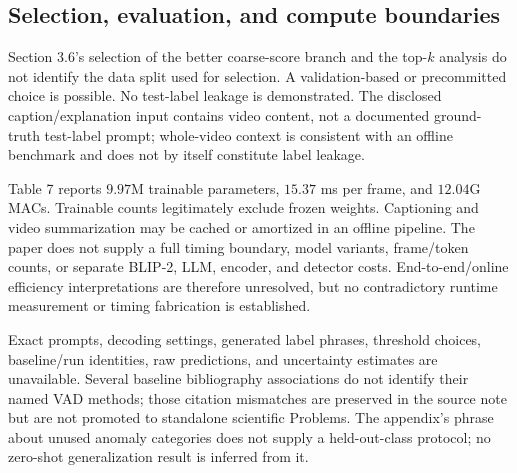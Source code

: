 \documentclass[10pt]{article}
\begin{document}
\subsection*{Selection, evaluation, and compute boundaries}
Section 3.6’s selection of the better coarse-score branch and the top-\(k\) analysis do not identify the data split used for selection. A validation-based or precommitted choice is possible. No test-label leakage is demonstrated. The disclosed caption/explanation input contains video content, not a documented ground-truth test-label prompt; whole-video context is consistent with an offline benchmark and does not by itself constitute label leakage.\par
Table 7 reports \(9.97\)M trainable parameters, \(15.37\) ms per frame, and \(12.04\)G MACs. Trainable counts legitimately exclude frozen weights. Captioning and video summarization may be cached or amortized in an offline pipeline. The paper does not supply a full timing boundary, model variants, frame/token counts, or separate BLIP-2, LLM, encoder, and detector costs. End-to-end/online efficiency interpretations are therefore unresolved, but no contradictory runtime measurement or timing fabrication is established.\par
Exact prompts, decoding settings, generated label phrases, threshold choices, baseline/run identities, raw predictions, and uncertainty estimates are unavailable. Several baseline bibliography associations do not identify their named VAD methods; those citation mismatches are preserved in the source note but are not promoted to standalone scientific Problems. The appendix’s phrase about unused anomaly categories does not supply a held-out-class protocol; no zero-shot generalization result is inferred from it.\par
\end{document}
